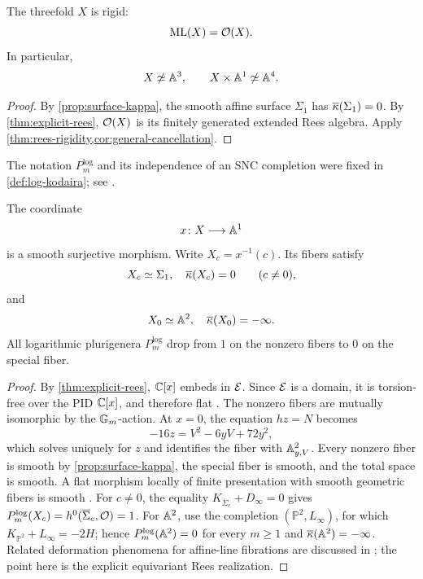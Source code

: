 \begin{corollary}\label{cor:X-rigid}
The threefold $X$ is rigid:
\[
  \operatorname{ML}(X)=\mathcal O(X).
\]
In particular,
\[
  X\not\simeq\mathbb A^3,
  \qquad
  X\times\mathbb A^1\not\simeq\mathbb A^4.
\]
\end{corollary}

\begin{proof}
By \cref{prop:surface-kappa}, the smooth affine surface $\Sigma_1$ has $\overline\kappa(\Sigma_1)=0$.  By \cref{thm:explicit-rees}, $\mathcal O(X)$ is its finitely generated extended Rees algebra.  Apply \cref{thm:rees-rigidity,cor:general-cancellation}.
\end{proof}


\begin{remark}\label{rem:log-plurigenera}
The notation $P_m^{\log}$ and its independence of an SNC completion were fixed in \cref{def:log-kodaira}; see \cite{Iitaka1977,Miyanishi2001}.
\end{remark}

\begin{proposition}\label{prop:smooth-family}
The coordinate
\[
  x\colon X\longrightarrow\mathbb A^1
\]
is a smooth surjective morphism.  Write $X_c=x^{-1}(c)$.  Its fibers satisfy
\[
  X_c\simeq\Sigma_1,
  \quad \overline\kappa(X_c)=0
  \qquad(c\neq0),
\]
and
\[
  X_0\simeq\mathbb A^2,
  \quad \overline\kappa(X_0)=-\infty.
\]
All logarithmic plurigenera $P_m^{\log}$ drop from $1$ on the nonzero fibers to $0$ on the special fiber.
\end{proposition}

\begin{proof}
By \cref{thm:explicit-rees}, $\mathbb C[x]$ embeds in $\mathcal E$.  Since $\mathcal E$ is a domain, it is torsion-free over the PID $\mathbb C[x]$, and therefore flat \cite[Tag 0AUW]{StacksProject}.  The nonzero fibers are mutually isomorphic by the $\mathbb G_m$-action.  At $x=0$, the equation $hz=N$ becomes
\[
  -16z=V^2-6yV+72y^2,
\]
which solves uniquely for $z$ and identifies the fiber with $\mathbb A^2_{y,V}$.  Every nonzero fiber is smooth by \cref{prop:surface-kappa}, the special fiber is smooth, and the total space is smooth.  A flat morphism locally of finite presentation with smooth geometric fibers is smooth \cite[Tag 01V4, Lemma 29.35.3]{StacksProject}.  For $c\neq0$, the equality $K_{\overline\Sigma_c}+D_{\infty}=0$ gives $P_m^{\log}(X_c)=h^0(\overline\Sigma_c,\mathcal O)=1$.  For $\mathbb A^2$, use the completion $(\mathbb P^2,L_\infty)$, for which $K_{\mathbb P^2}+L_\infty=-2H$; hence $P_m^{\log}(\mathbb A^2)=0$ for every $m\geq1$ and $\overline\kappa(\mathbb A^2)=-\infty$.  Related deformation phenomena for affine-line fibrations are discussed in \cite{GurjarMasudaMiyanishi2014}; the point here is the explicit equivariant Rees realization.
\end{proof}

